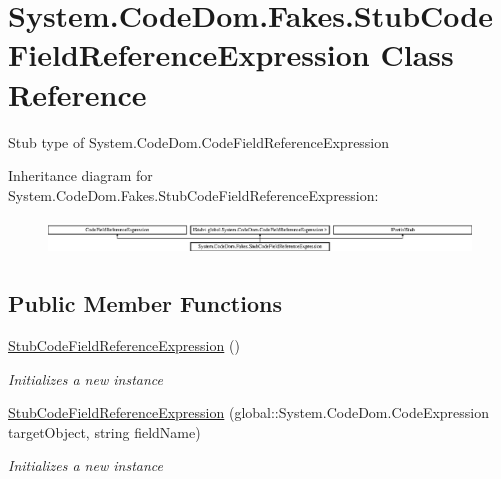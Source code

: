 \hypertarget{class_system_1_1_code_dom_1_1_fakes_1_1_stub_code_field_reference_expression}{\section{System.\-Code\-Dom.\-Fakes.\-Stub\-Code\-Field\-Reference\-Expression Class Reference}
\label{class_system_1_1_code_dom_1_1_fakes_1_1_stub_code_field_reference_expression}
}


Stub type of System.\-Code\-Dom.\-Code\-Field\-Reference\-Expression 


Inheritance diagram for System.\-Code\-Dom.\-Fakes.\-Stub\-Code\-Field\-Reference\-Expression\-:\begin{figure}[H]
\begin{center}
\leavevmode
\includegraphics[height=0.952381cm]{class_system_1_1_code_dom_1_1_fakes_1_1_stub_code_field_reference_expression}
\end{center}
\end{figure}
\subsection*{Public Member Functions}
\begin{DoxyCompactItemize}
\item 
\hyperlink{class_system_1_1_code_dom_1_1_fakes_1_1_stub_code_field_reference_expression_a3659c06005ec840f6bdb8f753e4a917f}{Stub\-Code\-Field\-Reference\-Expression} ()
\begin{DoxyCompactList}\small\item\em Initializes a new instance\end{DoxyCompactList}\item 
\hyperlink{class_system_1_1_code_dom_1_1_fakes_1_1_stub_code_field_reference_expression_abcf0efdc495dd79ea3e8fdbd6d6e338c}{Stub\-Code\-Field\-Reference\-Expression} (global\-::\-System.\-Code\-Dom.\-Code\-Expression target\-Object, string field\-Name)
\begin{DoxyCompactList}\small\item\em Initializes a new instance\end{DoxyCompactList}\end{DoxyCompactItemize}
